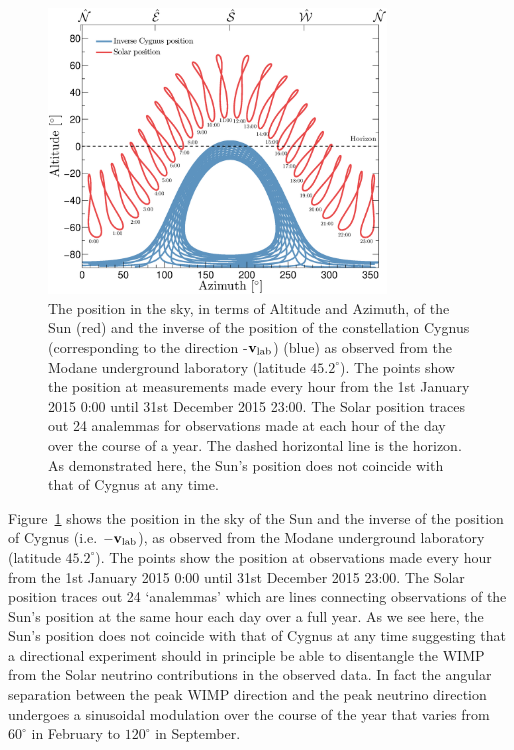  \begin{figure}
\begin{center}
\includegraphics[trim = 15mm 5mm 18mm 5mm, clip, width=0.8\textwidth,angle=0]{Figures/SolarCygnusDirections.eps}
\caption[The evolution of the position of the Sun and Cygnus in the sky]{The position in the sky, in terms of Altitude and Azimuth, of the Sun (red) and the inverse of the position of the constellation Cygnus (corresponding to the direction -$\bf{v}_\textrm{lab}$) (blue) as observed from the Modane underground laboratory (latitude $45.2^{\circ}$). The points show the position at measurements made every hour from the 1st January 2015 0:00 until 31st December 2015 23:00. The Solar position traces out 24 analemmas for observations made at each hour of the day over the course of a year. The dashed horizontal line is the horizon. As demonstrated here, the Sun's position does not coincide with that of Cygnus at any time.} 
\label{fig:solarcygnus}
\end{center}
\end{figure} 
Figure~\ref{fig:solarcygnus} shows the position in the sky of the Sun and the inverse of the position of Cygnus (i.e. $-\bf{v}_\textrm{lab}$), as observed from the Modane underground laboratory (latitude $45.2^{\circ}$). The points show the position at observations made every hour from the 1st January 2015 0:00 until 31st December 2015 23:00. The Solar position traces out 24 `analemmas' which are lines connecting observations of the Sun's position at the same hour each day over a full year. As we see here, the Sun's position does not coincide with that of Cygnus at any time suggesting that a directional experiment should in principle be able to disentangle the WIMP from the Solar neutrino contributions in the observed data. In fact the angular separation between the peak WIMP direction and the peak neutrino direction undergoes a sinusoidal modulation over the course of the year that varies from $60^{\circ}$ in February to $120^{\circ}$ in September.

